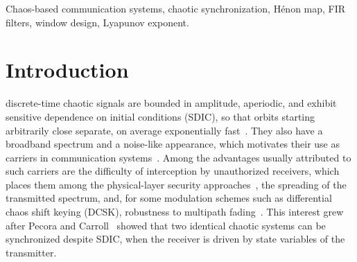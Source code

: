 \documentclass[journal]{IEEEtran}
\begin{document}
\begin{abstract}
The insertion of finite impulse response (FIR) filters in the feedback
loop of chaotic generators is a known strategy for bandwidth limitation in
chaos-based communication systems (CBCS). Although the filter does not
prevent master--slave synchronization, its interaction with the nonlinearity
of the generating map may destroy the chaotic behavior, so the presence of
chaos must be verified for each design. This work investigates, by means of
numerical simulations, the conditions under which chaos is preserved in the
two-dimensional H\'enon map with internal FIR filters, considering four
filter types (lowpass, highpass, bandpass, and bandstop) and seven design
windows, including a sweep of the Kaiser shape parameter. Points of the
order-cutoff plane whose orbits become unbounded are classified as
divergent. The remaining points are classified as chaotic when the largest
Lyapunov exponent, which measures the average exponential rate at which
nearby orbits separate, is positive, and as periodic otherwise.
The results show that filtering does not eliminate the chaotic regime but
reorganizes it in the parameter space in a way that depends on both the
filter type and the design window. Therefore, the spectral specification of
the filter alone does not ensure a chaotic generator, and the dynamics must
be verified for each design.
\end{abstract}

\begin{IEEEkeywords}
Chaos-based communication systems, chaotic synchronization, H\'enon map,
FIR filters, window design, Lyapunov exponent.
\end{IEEEkeywords}

\section{Introduction}\label{sec:intro}
 discrete-time chaotic signals are bounded in
amplitude, aperiodic, and exhibit sensitive dependence on initial conditions
(SDIC), so that orbits starting arbitrarily close separate, on average
exponentially fast~\cite{Alligood1996}. They also have a broadband spectrum
and a noise-like appearance, which motivates their use as carriers in
communication systems~\cite{Baptista2021}. Among the advantages usually
attributed to such carriers are the difficulty of interception by
unauthorized receivers, which places them among the physical-layer security
approaches~\cite{Mukherjee2014}, the spreading of the transmitted spectrum,
and, for some modulation schemes such as differential chaos shift keying
(DCSK), robustness to multipath fading~\cite{Kaddoum2016}. This
interest grew after Pecora and Carroll~\cite{Pecora1990} showed that two
identical chaotic systems can be synchronized despite SDIC, when the
receiver is driven by state variables of the transmitter.
\end{document}
